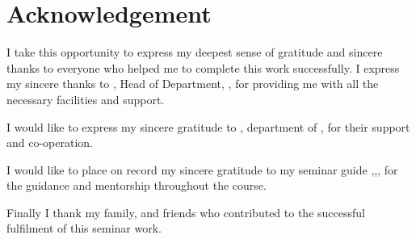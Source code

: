 \chapter*{Acknowledgement}%
%



I take this opportunity to express my deepest sense of gratitude and sincere thanks to everyone who helped me to complete this work successfully. I express my sincere thanks to \textbf{ \hod}, Head of Department, \dept, \college\hspace*{2pt} \collegeplace \hspace*{2pt} for providing  me with all the necessary facilities and support.\par

 I would like to express my sincere gratitude to \textbf{\semcoordinatorA}, \hspace*{2pt} department of \hspace*{2pt} \dept, \hspace*{2pt} \college \hspace*{2pt} \collegeplace \hspace*{2pt} for their support and co-operation.

\noindent I would like to place on record my sincere gratitude to my seminar guide \textbf{\guide},\hspace*{2pt}\guidedes,\hspace*{2pt}\dept,\hspace*{2pt}\college \hspace*{2pt} for the guidance and mentorship throughout the course.

Finally I thank my family, and friends who contributed to the successful fulfilment of this seminar work.

\vspace*{30pt}
\begin{flushright}
	\textbf{\author}
\end{flushright}
\thispagestyle{plain}
